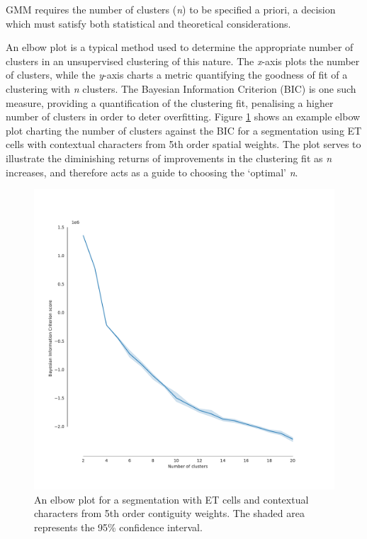 \documentclass[a4paper, nobind]{templates/ociamthesis}
\begin{document}
GMM requires the number of clusters (\emph{n}) to be specified a priori, a decision which must satisfy both statistical and theoretical considerations.

An elbow plot is a typical method used to determine the appropriate number of clusters in an unsupervised clustering of this nature. The \emph{x}-axis plots the number of clusters, while the \emph{y}-axis charts a metric quantifying the goodness of fit of a clustering with \emph{n} clusters. The Bayesian Information Criterion (BIC) is one such measure, providing a quantification of the clustering fit, penalising a higher number of clusters in order to deter overfitting. Figure \ref{fig:elbow} shows an example elbow plot charting the number of clusters against the BIC for a segmentation using ET cells with contextual characters from 5th order spatial weights. The plot serves to illustrate the diminishing returns of improvements in the clustering fit as \emph{n} increases, and therefore acts as a guide to choosing the `optimal' \emph{n}.

\begin{figure}

{\centering \includegraphics[width=1\linewidth]{figures/ET_BIC} 

}

\caption[An example elbow plot.]{An elbow plot for a segmentation with ET cells and contextual characters from 5th order contiguity weights. The shaded area represents the 95\% confidence interval.}\label{fig:elbow}
\end{figure}
\end{document}
